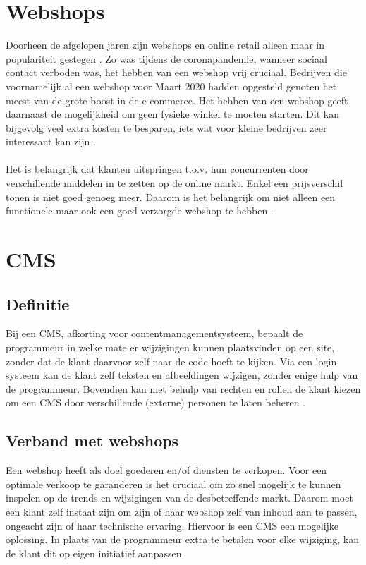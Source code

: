 \section{Webshops}
Doorheen de afgelopen jaren zijn webshops en online retail alleen maar in populariteit gestegen \autocite{Roggeveen2020}. Zo was tijdens de coronapandemie, wanneer sociaal contact verboden was, het hebben van een webshop vrij cruciaal. Bedrijven die voornamelijk al een webshop voor Maart 2020 hadden opgesteld genoten het meest van de grote boost in de e-commerce. Het hebben van een webshop geeft daarnaast de mogelijkheid om geen fysieke winkel te moeten starten. Dit kan bijgevolg veel extra kosten te besparen, iets wat voor kleine bedrijven zeer interessant kan zijn \autocite{Beckers2021}.
\\\\
Het is belangrijk dat klanten uitspringen t.o.v. hun concurrenten door verschillende middelen in te zetten op de online markt. Enkel een prijsverschil tonen is niet goed genoeg meer. Daarom is het belangrijk om niet alleen een functionele maar ook een goed verzorgde webshop te hebben \autocite{MatthiasF.Treutner2011}.
\section{CMS}
\subsection{Definitie}
Bij een CMS, afkorting voor contentmanagementsysteem, bepaalt de programmeur in welke mate er wijzigingen kunnen plaatsvinden op een site, zonder dat de klant daarvoor zelf naar de code hoeft te kijken. Via een login systeem kan de klant zelf teksten en afbeeldingen wijzigen, zonder enige hulp van de programmeur. Bovendien kan met behulp van rechten en rollen de klant kiezen om een CMS door verschillende (externe) personen te laten beheren \autocite{Browning2001}.
\subsection{Verband met webshops}
Een webshop heeft als doel goederen en/of diensten te verkopen. Voor een optimale verkoop te garanderen is het cruciaal om zo snel mogelijk te kunnen inspelen op de trends en wijzigingen van de desbetreffende markt. Daarom moet een klant zelf instaat zijn om zijn of haar webshop zelf van inhoud aan te passen, ongeacht zijn of haar technische ervaring. Hiervoor is een CMS een mogelijke oplossing. In plaats van de programmeur extra te betalen voor elke wijziging, kan de klant dit op eigen initiatief aanpassen.
